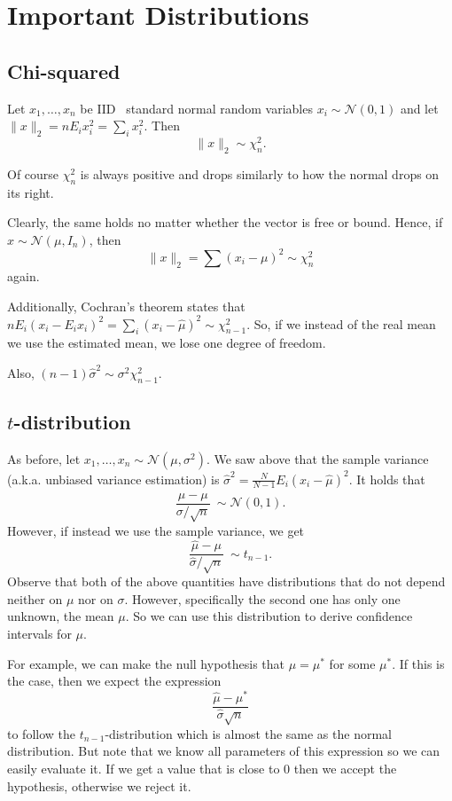 \documentclass[11pt]{article}
\theoremstyle{definition}
\newcommand{\IID}{\textsf{IID}}
\newcommand{\Normal}[2]{\ensuremath{\mathcal N (#1, #2)}}
\begin{document}
\section{Important Distributions}

\subsection{Chi-squared}
Let $x_1,\ldots,x_n$ be \IID~ standard normal random variables
$x_i\sim\mathcal{N}(0,1)$ and let $\|x\|_2=nE_ix_i^2=\sum_i x_i^2$. Then
$$\|x\|_2\sim\chi_n^2.$$

Of course $\chi_n^2$ is always positive and drops similarly to how the normal
drops on its right.

Clearly, the same holds no matter whether the vector is free or bound. Hence, if
$x\sim\mathcal{N}(\mu,I_n)$, then $$\|x\|_2=\sum(x_i-\mu)^2\sim\chi_n^2$$ again.

Additionally, Cochran's theorem states that
$nE_i(x_i-E_ix_i)^2=\sum_i(x_i-\hat\mu)^2\sim\chi_{n-1}^2$. So, if we instead of
the real mean we use the estimated mean, we lose one degree of freedom.

Also, $(n-1)\hat\sigma^2\sim \sigma^2\chi_{n-1}^2$.

\subsection{$t$-distribution}
As before, let $x_1,\ldots,x_n\sim\Normal\mu{\sigma^2}$. We saw above that the
sample variance (a.k.a. unbiased variance estimation) is
$\hat\sigma^2=\frac{N}{N-1}E_i(x_i-\hat\mu)^2$. It holds that
\begin{equation}
	\frac{\hat\mu-\mu}{\sigma/\sqrt n}~\sim\Normal{0}{1}. \tag{See Wiki}
\end{equation}
However, if instead we use the sample variance, we get
\begin{equation}
	\frac{\hat\mu-\mu}{\hat\sigma/\sqrt n}~\sim t_{n-1}.
\end{equation}
Observe that both of the above quantities have distributions that do not depend
neither on $\mu$ nor on $\sigma$. However, specifically the second one has only
one unknown, the mean $\mu$. So we can use this distribution to derive
confidence intervals for $\mu$.

For example, we can make the null hypothesis that $\mu=\mu^*$ for some $\mu^*$.
If this is the case, then we expect the expression
\[\frac{\hat\mu-\mu^*}{\hat\sigma\sqrt{n}}\] to follow the
$t_{n-1}$-distribution which is almost the same as the normal distribution. But
note that we know all parameters of this expression so we can easily evaluate
it. If we get a value that is close to 0 then we accept the hypothesis,
otherwise we reject it.
\end{document}
